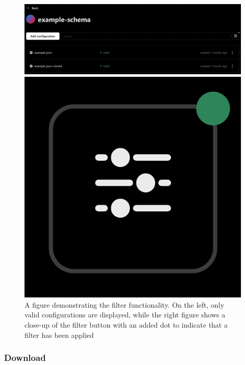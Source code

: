 \begin{figure}[!ht]
   \begin{minipage}{0.73\textwidth}
     \centering
     \includegraphics[width=.9\linewidth]{Figures/configurations-page/filter-selected-crop.pdf}
   \end{minipage}
   \hspace{0.01cm}
   \begin{minipage}{0.235\textwidth}
     \centering
     \includegraphics[width=.9\linewidth]{Figures/configurations-page/filter-selected-button-crop.pdf}
   \end{minipage}
   \caption[Filter demo, valid configs only \& filter dot]{A figure demonstrating the filter functionality. On the left, only valid configurations are displayed, while the right figure shows a close-up of the filter button with an added dot to indicate that a filter has been applied}
   \label{filter-selected:configuration}
\end{figure}

\subsubsection{Download}

